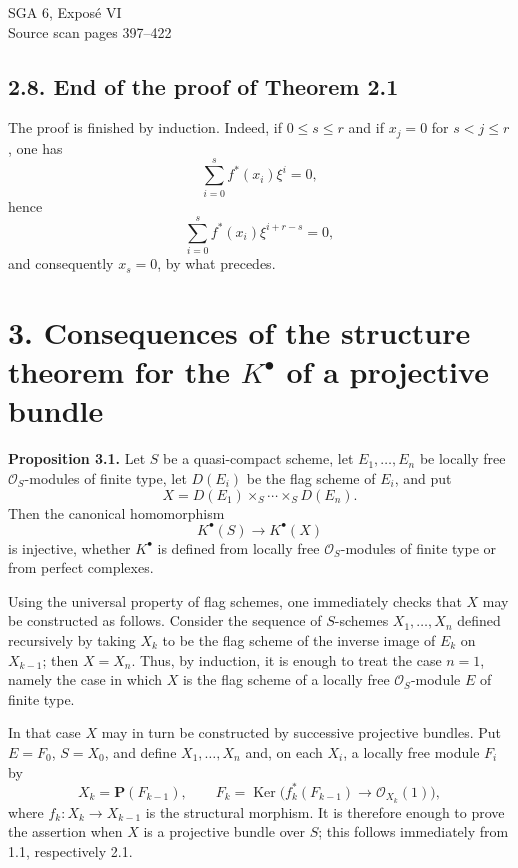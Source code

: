 \documentclass[11pt]{article}
\providecommand{\Ker}{\operatorname{Ker}}
\begin{document}
\begin{center}
{\Large SGA 6, Exposé VI}\\[0.3em]
{\large Source scan pages 397--422}
\end{center}

\subsection*{2.8. End of the proof of Theorem 2.1}
The proof is finished by induction. Indeed, if \(0\leq s\leq r\) and if \(x_j=0\) for \(s<j\leq r\), one has
\[
  \sum_{i=0}^{s} f^*(x_i)\xi^i=0,
\]
hence
\[
  \sum_{i=0}^{s} f^*(x_i)\xi^{i+r-s}=0,
\]
and consequently \(x_s=0\), by what precedes.

\section*{3. Consequences of the structure theorem for the \(K^\bullet\) of a projective bundle}

\textbf{Proposition 3.1.} Let \(S\) be a quasi-compact scheme, let \(E_1,\ldots,E_n\) be locally free \(\mathcal O_S\)-modules of finite type, let \(D(E_i)\) be the flag scheme of \(E_i\), and put
\[
  X=D(E_1)\times_S\cdots\times_S D(E_n).
\]
Then the canonical homomorphism
\[
  K^\bullet(S)\longrightarrow K^\bullet(X)
\]
is injective, whether \(K^\bullet\) is defined from locally free \(\mathcal O_S\)-modules of finite type or from perfect complexes.

Using the universal property of flag schemes, one immediately checks that \(X\) may be constructed as follows. Consider the sequence of \(S\)-schemes \(X_1,\ldots,X_n\) defined recursively by taking \(X_k\) to be the flag scheme of the inverse image of \(E_k\) on \(X_{k-1}\); then \(X=X_n\). Thus, by induction, it is enough to treat the case \(n=1\), namely the case in which \(X\) is the flag scheme of a locally free \(\mathcal O_S\)-module \(E\) of finite type.

In that case \(X\) may in turn be constructed by successive projective bundles. Put \(E=F_0\), \(S=X_0\), and define \(X_1,\ldots,X_n\) and, on each \(X_i\), a locally free module \(F_i\) by
\[
  X_k=\mathbf P(F_{k-1}),\qquad
  F_k=\Ker\bigl(f_k^*(F_{k-1})\longrightarrow\mathcal O_{X_k}(1)\bigr),
\]
where \(f_k:X_k\to X_{k-1}\) is the structural morphism. It is therefore enough to prove the assertion when \(X\) is a projective bundle over \(S\); this follows immediately from 1.1, respectively 2.1.
\end{document}
